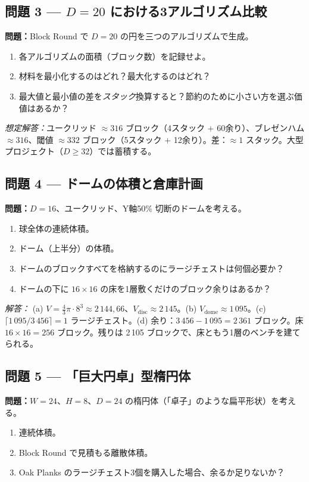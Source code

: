\documentclass[12pt,a4paper]{scrartcl}
\begin{document}
\subsection*{問題 3 --- $D=20$ における3アルゴリズム比較}
\textbf{問題：}Block Round で $D = 20$ の円を三つのアルゴリズムで生成。
\begin{enumerate}[label=\alph*),leftmargin=1.5em,itemsep=0.1em,topsep=0.2em,nosep]
  \item 各アルゴリズムの面積（ブロック数）を記録せよ。
  \item 材料を最小化するのはどれ？最大化するのはどれ？
  \item 最大値と最小値の差を\emph{スタック}換算すると？節約のために小さい方を選ぶ価値はあるか？
\end{enumerate}

\emph{想定解答：}ユークリッド $\approx 316$ ブロック（4スタック $+$ 60余り）、ブレゼンハム $\approx 316$、閾値 $\approx 332$ ブロック（5スタック $+$ 12余り）。差：$\approx 1$ スタック。大型プロジェクト（$D \geq 32$）では蓄積する。

\subsection*{問題 4 --- ドームの体積と倉庫計画}
\textbf{問題：}$D = 16$、ユークリッド、Y軸50\% 切断のドームを考える。
\begin{enumerate}[label=\alph*),leftmargin=1.5em,itemsep=0.1em,topsep=0.2em,nosep]
  \item 球全体の連続体積。
  \item ドーム（上半分）の体積。
  \item ドームのブロックすべてを格納するのにラージチェストは何個必要か？
  \item ドームの下に $16 \times 16$ の床を1層敷くだけのブロック余りはあるか？
\end{enumerate}

\emph{解答：}
(a) $V = \tfrac{4}{3}\pi \cdot 8^3 \approx 2\,144{,}66$、$V_{\mathrm{disc}} \approx 2\,145$。(b) $V_{\mathrm{dome}} \approx 1\,095$。(c) $\lceil 1\,095 / 3\,456 \rceil = 1$ ラージチェスト。(d) 余り：$3\,456 - 1\,095 = 2\,361$ ブロック。床 $16 \times 16 = 256$ ブロック。残りは 2\,105 ブロックで、床ともう1層のベンチを建てられる。

\subsection*{問題 5 --- 「巨大円卓」型楕円体}
\textbf{問題：}$W = 24$、$H = 8$、$D = 24$ の楕円体（「卓子」のような扁平形状）を考える。
\begin{enumerate}[label=\alph*),leftmargin=1.5em,itemsep=0.1em,topsep=0.2em,nosep]
  \item 連続体積。
  \item Block Round で見積もる離散体積。
  \item Oak Planks のラージチェスト3個を購入した場合、余るか足りないか？
\end{enumerate}
\end{document}
